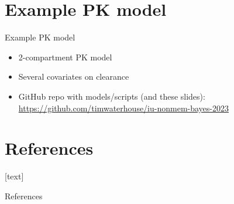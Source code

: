 \documentclass[handout]{beamer}
\begin{document}
\section{Example PK model}

\begin{frame}{Example PK model}

  \begin{itemize}
    \item 2-compartment PK model
    \item Several covariates on clearance
    \item GitHub repo with models/scripts (and these slides): \url{https://github.com/timwaterhouse/iu-nonmem-bayes-2023}
  \end{itemize}
\end{frame}

\section{References}

[text]

\begin{frame}[allowframebreaks]{References}

\scriptsize

% 



\end{frame}


  
\end{document}
